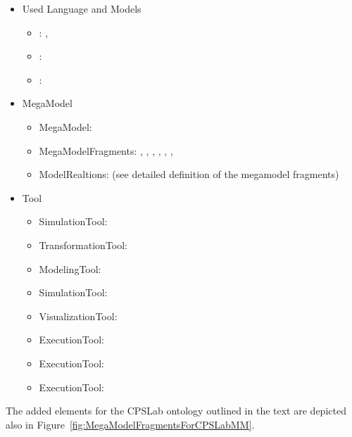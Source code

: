 \begin{itemize}
    \item Used Language and Models
    \begin{itemize}
        \item \MATLABSimulinkLanguage: \CPSLabControlModel, \CPSLabPlantModel
        \item \FESTORobotinoSimLanguage: \CPSLabRobotModel
        \item \AUTOSARLanguage: \CPSLabSystemModel
    \end{itemize}
    \item MegaModel
    \begin{itemize}
        \item MegaModel: \CPSLabMM
        \item MegaModelFragments: \CPSLabMTMMF, \CPSLabMiLMMF, \CPSLabRPaMMF, \CPSLabRPbMMF, \CPSLabSiLaMMF, \CPSLabSiLbMMF, \CPSLabHiLMMF
        \item ModelRealtions: (see detailed definition of the megamodel fragments)
    \end{itemize}
    \item Tool
    \begin{itemize}
        \item SimulationTool: \MATLABSimulinkSimulator
        \item TransformationTool: \dSPACETargetLink
        \item ModelingTool: \dSPACESystemDesk
        \item SimulationTool: \FESTORobotinoSim
        \item VisualizationTool: \FESTORobotinoView
        \item ExecutionTool: \DesktopExecution
        \item ExecutionTool: \RobotExecutionRemote
        \item ExecutionTool: \RobotExecutionLocal {}
    \end{itemize}
\end{itemize}




The added elements for the CPSLab ontology outlined in the text are depicted also in Figure~\ref{fig:MegaModelFragmentsForCPSLabMM}.

